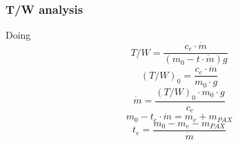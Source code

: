 \subsubsection{T/W analysis}
Doing
\begin{equation}
	T / W = \frac{c_e \cdot \dot{m}}{(m_0 - t \cdot \dot{m}) g}
\end{equation}
\begin{equation}
	(T / W)_0 = \frac{c_e \cdot \dot{m}}{m_0 \cdot g}
\end{equation}
\begin{equation}
	\dot{m} = \frac{(T/W)_0 \cdot m_0 \cdot g}{c_e}
\end{equation}
\begin{equation}
	m_0 - t_e \cdot \dot{m} = m_e + m_{PAX}
\end{equation}
\begin{equation}
	t_e = \frac{m_0 - m_e - m_{PAX}}{\dot{m}}
\end{equation}